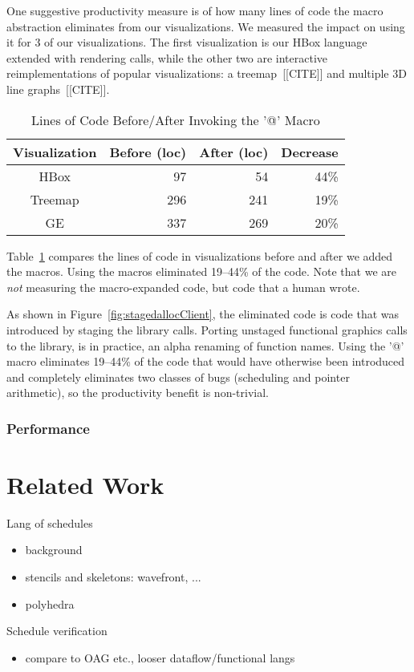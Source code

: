 One suggestive productivity measure is of how many lines of code the macro abstraction eliminates from our visualizations. We measured the impact on using it for 3 of our visualizations. The first visualization is our HBox language extended with rendering calls, while the other two are interactive reimplementations of popular visualizations: a treemap~[[CITE]] and multiple 3D line graphs~[[CITE]].


\begin{table}[ht]
\caption{Lines of Code Before/After Invoking the '@' Macro}
\centering
\begin{tabular}{c r r r}
\hline\hline
 \textbf{Visualization} & \textbf{Before (loc)} & \textbf{After (loc)} & \textbf{Decrease} \\ [0.5ex] \hline
  HBox & 97 & 54 & 44\% \\
  Treemap & 296 & 241 & 19\% \\
  GE & 337 & 269 & 20\% \\ [1ex] 
\hline
\end{tabular}
\label{table:macroreduction}
\end{table}
Table~\ref{table:macroreduction} compares the lines of code in visualizations before and after we added the macros. Using the macros eliminated 19--44\% of the code. Note that we are \emph{not} measuring the macro-expanded code, but code that a human wrote.



As shown in Figure~\ref{fig:stagedallocClient}, the eliminated code is code that was introduced by staging the library calls. Porting unstaged functional graphics calls to the library, is in practice, an alpha renaming of function names.  Using the '@' macro eliminates 19--44\% of the code that would have otherwise been introduced and completely eliminates two classes of bugs (scheduling and pointer arithmetic), so the productivity benefit is non-trivial. 

\subsubsection{Performance}


\section{Related Work}
Lang of schedules
\begin{itemize}
\item background
\item stencils and skeletons: wavefront, ...
\item polyhedra
\end{itemize}
Schedule verification
\begin{itemize}
\item compare to OAG etc., looser dataflow/functional langs
\end{itemize}